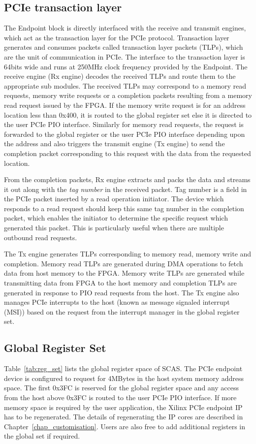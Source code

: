 \subsection{PCIe transaction layer}
The Endpoint block is directly interfaced with the receive and transmit engines, which act as the transaction layer for the PCIe protocol.
Transaction layer generates and consumes packets called transaction layer packets (TLPs), which are the unit of communication in PCIe.
The interface to the transaction layer is 64bits wide and runs at 250MHz clock frequency provided by the Endpoint.
The receive engine (Rx engine) decodes the received TLPs and route them to the appropriate sub modules.
The received TLPs may correspond to a memory read requests, memory write requests or a completion packets resulting from a memory read request issued by the FPGA.
If the memory write request is for an address location less than 0x400, it is routed to the global register set else it is directed to the user PCIe PIO interface.
Similarly for memory read requests, the request is forwarded to the global register or the user PCIe PIO interface depending upon the address and also triggers the transmit engine (Tx engine) to send the completion packet corresponding to this request with the data from the requested location.

From the completion packets, Rx engine extracts and packs the data and streams it out along with the \emph{tag number} in the received packet.
Tag number is a field in the PCIe packet inserted by a read operation initiator.
The device which responds to a read request should keep this same tag number in the completion packet, which enables the initiator to determine the specific request which generated this packet.
This is particularly useful when there are multiple outbound read requests.

The Tx engine generates TLPs corresponding to memory read, memory write and completion.
Memory read TLPs are generated during DMA operations to fetch data from host memory to the FPGA.
Memory write TLPs are generated while transmitting data from FPGA to the host memory and completion TLPs are generated in response to PIO read requests from the host.
The Tx engine also manages PCIe interrupts to the host (known as message signaled interrupt (MSI)) based on the request from the interrupt manager in the global register set.

\subsection{Global Register Set}
Table~\ref{tab:reg_set} lists the global register space of SCAS.
The PCIe endpoint device is configured to request for 4MBytes in the host system memory address space.
The first 0x3FC is reserved for the global register space and any access from the host above 0x3FC is routed to the user PCIe PIO interface.
If more memory space is required by the user application, the Xilinx PCIe endpoint IP has to be regenerated.
The details of regenerating the IP cores are described in Chapter~\ref{chap_customisation}.
Users are also free to add additional registers in the global set if required.

